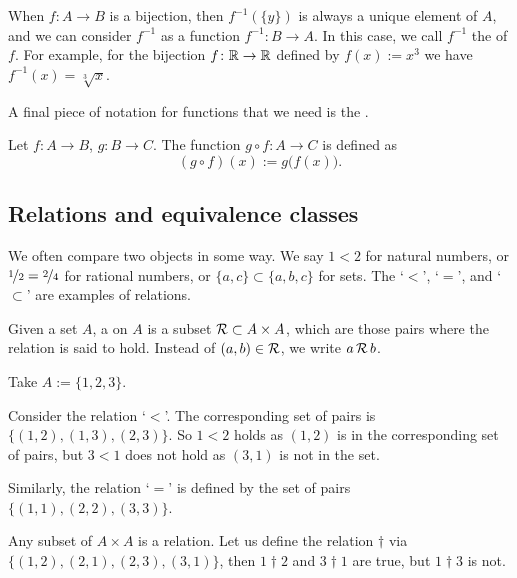 When $f \colon A \to B$ is a bijection, then $f^{-1}(\{y\})$ is always
a unique element of $A$, and we can consider $f^{-1}$ as a function
$f^{-1} \colon B \to A$.
In this case, we call $f^{-1}$ the \emph{} of $f$.
For example, for the bijection $f \colon {\mathbb{R}} \to {\mathbb{R}}$ defined by $f(x) := x^3$ we have
$f^{-1}(x) = \sqrt[3]{x}$.

A final piece of notation for functions that
we need is the \emph{}.

\begin{defn}
Let $f \colon A \to B$, $g \colon B \to C$.  The function 
$g \circ f \colon A \to C$ is defined as
\begin{equation*}
(g \circ f)(x) := g\bigl(f(x)\bigr) .
\end{equation*}
\end{defn}

\subsection{Relations and equivalence classes}

We often compare two objects in some way.  We say $1 < 2$
for natural numbers, or $\nicefrac{1}{2} = \nicefrac{2}{4}$ for rational
numbers, or $\{ a,c \} \subset \{ a,b,c \}$ for sets.  The `$<$', `$=$', and
`$\subset$' are examples of
relations.

\begin{defn}
Given a set $A$, a \emph{} on $A$
is a subset ${\mathcal{R}} \subset A \times A$,
which are those pairs where the relation is said to hold.
Instead of $(a,b) \in {\mathcal{R}}$, we write
$a \, {\mathcal{R}} \, b$.
\end{defn}

\begin{example}
Take $A := \{ 1,2,3 \}$.

Consider the relation `$<$'.  The corresponding set 
of pairs is $\bigl\{ (1,2), (1,3), (2,3) \bigr\}$.  So $1 < 2$ holds as $(1,2)$
is in the corresponding set of pairs, but $3 < 1$ does not hold as $(3,1)$ is
not in the set.

Similarly, the relation `$=$'
is defined by the set of pairs $\bigl\{ (1,1), (2,2), (3,3) \big\}$.

Any subset of $A \times A$ is a relation.  Let us define the relation
$\dagger$ via $\bigl\{ (1,2), (2,1), (2,3), (3,1) \bigr\}$, then $1 \dagger 2$ and
$3 \dagger 1$ are
true, but $1 \dagger 3$ is not.
\end{example}

